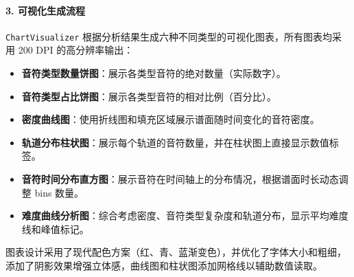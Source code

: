 \documentclass[12pt, a4paper]{article}
\begin{document}
\paragraph{3. 可视化生成流程}
\texttt{ChartVisualizer} 根据分析结果生成六种不同类型的可视化图表，所有图表均采用 200 DPI 的高分辨率输出：
\begin{itemize}
    \item \textbf{音符类型数量饼图}：展示各类型音符的绝对数量（实际数字）。
    \item \textbf{音符类型占比饼图}：展示各类型音符的相对比例（百分比）。
    \item \textbf{密度曲线图}：使用折线图和填充区域展示谱面随时间变化的音符密度。
    \item \textbf{轨道分布柱状图}：展示每个轨道的音符数量，并在柱状图上直接显示数值标签。
    \item \textbf{音符时间分布直方图}：展示音符在时间轴上的分布情况，根据谱面时长动态调整 bins 数量。
    \item \textbf{难度曲线分析图}：综合考虑密度、音符类型复杂度和轨道分布，显示平均难度线和峰值标记。
\end{itemize}
图表设计采用了现代配色方案（红、青、蓝渐变色），并优化了字体大小和粗细，添加了阴影效果增强立体感，曲线图和柱状图添加网格线以辅助数值读取。
\end{document}
